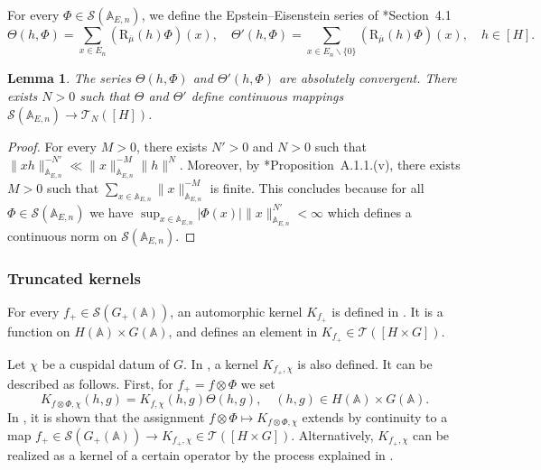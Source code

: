 \documentclass[letterpaper,11pt]{amsart}
\newcommand{\bA}{\mathbb{A}}
\newcommand{\cS}{\mathcal{S}}
\newcommand{\cT}{\mathcal{T}}
\newcommand{\<}{\negthickspace}
\providecommand{\aabs}[1]{\lVert#1\rVert}
\newcommand{\valP}[1]{\left|#1\right|}
\theoremstyle{definition}
\theoremstyle{plain}
\newtheorem{lemma}[definition]{Lemma}
\theoremstyle{remark}
\numberwithin{equation}{section}
\begin{document}
For every $\Phi \in \cS(\bA_{E,n})$, we define the Epstein--Eisenstein series of \cite{JS}*{Section~4.1}\begin{equation}
    \label{eq:theta_defi}
    \Theta(h, \Phi) =
    \sum_{x \in E_n} (\mathrm{R}_{\overline{\mu}}(h)\Phi)(x), \quad \Theta'(h, \Phi) =
    \sum_{x \in E_n\backslash\{0\}} (\mathrm{R}_{\overline{\mu}}(h)\Phi)(x), \quad h \in [H].
\end{equation}


    \begin{lemma}
        \label{lem:theta_moderate}
        The series $\Theta(h, \Phi)$ and $\Theta'(h, \Phi)$ are absolutely convergent. There exists $N>0$ such that $\Theta$ and $\Theta'$ define continuous mappings $\cS(\bA_{E,n}) \to \cT_{N}([H])$.
    \end{lemma}

    \begin{proof}
        For every $M>0$, there exists $N'>0$ and $N>0$ such that $\aabs{xh}_{\bA_{E,n}}^{-N'} \ll \aabs{x}_{\bA_{E,n}}^{-M} \aabs{h}^N$. Moreover, by \cite{BP}*{Proposition~A.1.1.(v)}, there exists $M>0$ such that $\sum_{x \in \bA_{E,n}} \aabs{x}_{\bA_{E,n}}^{-M}$ is finite. This concludes because for all $\Phi \in \cS(\bA_{E,n})$ we have $\sup_{x \in \bA_{E,n}} \valP{\Phi(x)}\aabs{x}_{\bA_{E,n}}^{N'} < \infty$ which defines a continuous norm on $\cS(\bA_{E,n})$.
    \end{proof}


    \subsubsection{Truncated kernels}
    \label{subsec:truncated_kernels_gln}

    For every $f_+ \in \cS(G_+(\bA))$, an automorphic kernel $K_{f_+}$ is defined in \cite[Section~5.3]{BLX1}. It is a function on $H(\bA) \times G(\bA)$, and defines an element in $K_{f_+} \in \cT([H\times G])$.
    
    Let $\chi$ be a cuspidal datum of $G$. In \cite[Section~5.3]{BLX1}, a kernel $K_{f_+,\chi}$ is also defined. It can be described as follows. First, for $f_+=f \otimes \Phi$ we set
    \begin{equation}
        \label{eq:kernel_f_+}
        K_{f \otimes \Phi,\chi}(h,g)=K_{f,\chi}(h,g) \Theta(h,g), \quad (h,g) \in H(\bA) \times G(\bA).
    \end{equation}
    In \cite[Section~5.3]{BLX1}, it is shown that the assignment $f \otimes \Phi \mapsto K_{f \otimes \Phi,\chi}$ extends by continuity to a map $f_+ \in \cS(G_+(\bA)) \to K_{f_+,\chi} \in \cT([H \times G])$. Alternatively, $K_{f_+,\chi}$ can be realized as a kernel of a certain operator by the process explained in \cite[Section~5.3]{BLX1}.
\end{document}
